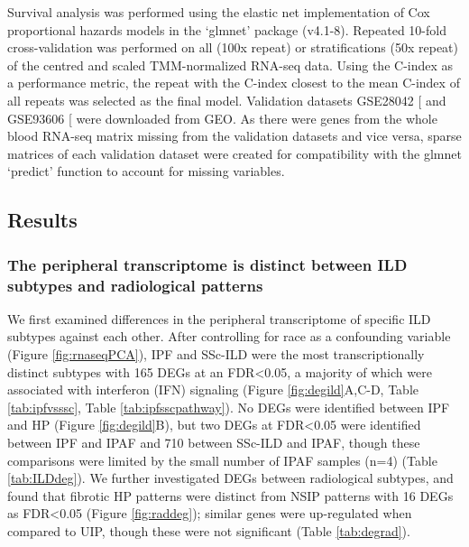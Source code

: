 \documentclass[
]{article}
\begin{document}
Survival analysis was performed using the elastic net implementation of Cox proportional hazards models in the `glmnet' package (v4.1-8). Repeated 10-fold cross-validation was performed on all (100x repeat) or stratifications (50x repeat) of the centred and scaled TMM-normalized RNA-seq data. Using the C-index as a performance metric, the repeat with the C-index closest to the mean C-index of all repeats was selected as the final model. Validation datasets GSE28042 {[}\citeproc{ref-herazo-maya_peripheral_2013}{59}{]} and GSE93606 {[}\citeproc{ref-molyneaux_host-microbial_2017}{55}{]} were downloaded from GEO. As there were genes from the whole blood RNA-seq matrix missing from the validation datasets and vice versa, sparse matrices of each validation dataset were created for compatibility with the glmnet `predict' function to account for missing variables.

\subsection{Results}\label{results-2}

\subsubsection{The peripheral transcriptome is distinct between ILD subtypes and radiological patterns}\label{the-peripheral-transcriptome-is-distinct-between-ild-subtypes-and-radiological-patterns}

We first examined differences in the peripheral transcriptome of specific ILD subtypes against each other. After controlling for race as a confounding variable (Figure \ref{fig:rnaseqPCA}), IPF and SSc-ILD were the most transcriptionally distinct subtypes with 165 DEGs at an FDR\textless0.05, a majority of which were associated with interferon (IFN) signaling (Figure \ref{fig:degild}A,C-D, Table \ref{tab:ipfvsssc}, Table \ref{tab:ipfsscpathway}). No DEGs were identified between IPF and HP (Figure \ref{fig:degild}B), but two DEGs at FDR\textless0.05 were identified between IPF and IPAF and 710 between SSc-ILD and IPAF, though these comparisons were limited by the small number of IPAF samples (n=4) (Table \ref{tab:ILDdeg}). We further investigated DEGs between radiological subtypes, and found that fibrotic HP patterns were distinct from NSIP patterns with 16 DEGs as FDR\textless0.05 (Figure \ref{fig:raddeg}); similar genes were up-regulated when compared to UIP, though these were not significant (Table \ref{tab:degrad}).
\end{document}
